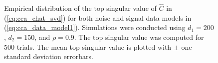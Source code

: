 \begin{figure}[h!]
  \centering
  \caption{Empirical distribution of the top singular value of $\widehat{C}$ in
    (\ref{eq:cca_chat_svd}) for both noise and signal data models in
    (\ref{eq:cca_data_model1}). Simulations were conducted using $d_1=200$, $d_2=150$, and
    $\rho=0.9$. The top singular value was computed for 500 trials. The mean top singular
    value is plotted with $\pm$ one standard deviation errorbars. }
  \label{fig:cca_errorbars}
\end{figure}

